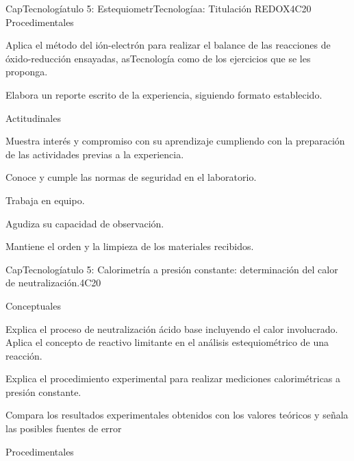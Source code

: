 \begin{syllabus}
\begin{unit}{CapTecnologíatulo 5:  EstequiometrTecnologíaa: Titulación REDOX}{}{}{4}{C20}
   Procedimentales

\begin{topics}
      \item Aplica el método del ión-electrón para realizar el balance de las reacciones de óxido-reducción ensayadas, asTecnología como de los ejercicios que se les proponga.
      \item Elabora un reporte escrito de la experiencia, siguiendo formato establecido.
   \end{topics}
   
   Actitudinales

\begin{topics}
      \item Muestra interés y compromiso con su aprendizaje cumpliendo con la preparación de las actividades previas a la experiencia.
      \item Conoce y cumple las normas de seguridad en el laboratorio.
      \item Trabaja en equipo.
      \item Agudiza su capacidad de observación.
     \item Mantiene el orden y la limpieza de los materiales recibidos.
   \end{topics}

   \begin{learningoutcomes}
      \item 
   \end{learningoutcomes}
   
\end{unit}

\begin{unit}{CapTecnologíatulo 5:  Calorimetría a presión constante: determinación del calor de neutralización.}{}{}{4}{C20}

Conceptuales

\begin{topics}
      \item  Explica el proceso de neutralización ácido base incluyendo el calor involucrado.
   Aplica el concepto de reactivo limitante en el análisis estequiométrico de una reacción.
	\item Explica el procedimiento experimental para realizar mediciones calorimétricas a presión constante.
	\item Compara los resultados experimentales obtenidos con los valores teóricos y señala las posibles fuentes de error 
   \end{topics}
   
   Procedimentales


\end{unit}
\end{syllabus}
